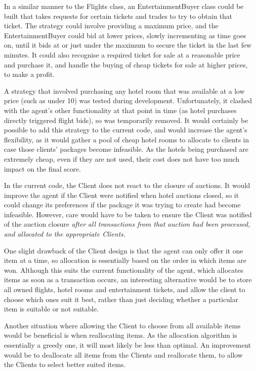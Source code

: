 \documentclass{acm_proc_article-sp}
\begin{document}
 In a similar manner to the Flights class, an EntertainmentBuyer class could be built that takes requests for certain tickets and trades to try to obtain that ticket.  The strategy could involve providing a maximum price, and the EntertainmentBuyer could bid at lower prices, slowly incrementing as time goes on, until it bids at or just under the maximum to secure the ticket in the last few minutes.  It could also recognise a required ticket for sale at a reasonable price and purchase it, and handle the buying of cheap tickets for sale at higher prices, to make a profit.
 
 A strategy that involved purchasing any hotel room that was available at a low price (such as under 10) was tested during development.  Unfortunately, it clashed with the agent's other functionality at that point in time (as hotel purchases directly triggered flight bids), so was temporarily removed.  It would certainly be possible to add this strategy to the current code, and would increase the agent's flexibility, as it would gather a pool of cheap hotel rooms to allocate to clients in case those clients' packages become infeasible.  As the hotels being purchased are extremely cheap, even if they are not used, their cost does not have too much impact on the final score.
 
 In the current code, the Client does not react to the closure of auctions.  It would improve the agent if the Client were notified when hotel auctions closed, so it could change its preferences if the package it was trying to create had become infeasible.  However, care would have to be taken to ensure the Client was notified of the auction closure \em after \em all transactions from that auction had been processed, and allocated to the appropriate Clients.
  
 One slight drawback of the Client design is that the agent can only offer it one item at a time, so allocation is essentially based on the order in which items are won.  Although this suits the current functionality of the agent, which allocates items as soon as a transaction occurs, an interesting alternative would be to store all owned flights, hotel rooms and entertainment tickets, and allow the client to choose which ones suit it best, rather than just deciding whether a particular item is suitable or not suitable.
 
 Another situation where allowing the Client to choose from all available items would be beneficial is when reallocating items.  As the allocation algorithm is essentially a greedy one, it will most likely be less than optimal.  An improvement would be to deallocate all items from the Clients and reallocate them, to allow the Clients to select better suited items.
 
\end{document}
